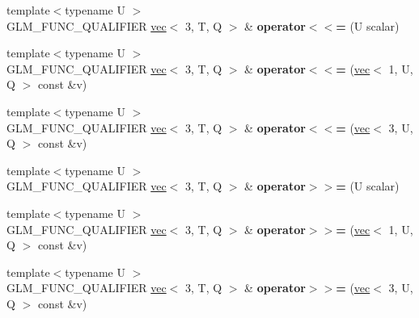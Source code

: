 \begin{DoxyCompactItemize}
{\footnotesize template$<$typename U $>$ }\\G\+L\+M\+\_\+\+F\+U\+N\+C\+\_\+\+Q\+U\+A\+L\+I\+F\+I\+ER \hyperlink{structglm_1_1vec}{vec}$<$ 3, T, Q $>$ \& {\bfseries operator$<$$<$=} (U scalar)
\item 
\mbox{\label{structglm_1_1vec_3_013_00_01T_00_01Q_01_4_a4db1d87628b5f4ee744873e4affc61e5}} 
{\footnotesize template$<$typename U $>$ }\\G\+L\+M\+\_\+\+F\+U\+N\+C\+\_\+\+Q\+U\+A\+L\+I\+F\+I\+ER \hyperlink{structglm_1_1vec}{vec}$<$ 3, T, Q $>$ \& {\bfseries operator$<$$<$=} (\hyperlink{structglm_1_1vec}{vec}$<$ 1, U, Q $>$ const \&v)
\item 
\mbox{\label{structglm_1_1vec_3_013_00_01T_00_01Q_01_4_a0e01e643e55134493df457aa0b17308e}} 
{\footnotesize template$<$typename U $>$ }\\G\+L\+M\+\_\+\+F\+U\+N\+C\+\_\+\+Q\+U\+A\+L\+I\+F\+I\+ER \hyperlink{structglm_1_1vec}{vec}$<$ 3, T, Q $>$ \& {\bfseries operator$<$$<$=} (\hyperlink{structglm_1_1vec}{vec}$<$ 3, U, Q $>$ const \&v)
\item 
\mbox{\label{structglm_1_1vec_3_013_00_01T_00_01Q_01_4_a63341fff7a58c15da93cf79016cdeefa}} 
{\footnotesize template$<$typename U $>$ }\\G\+L\+M\+\_\+\+F\+U\+N\+C\+\_\+\+Q\+U\+A\+L\+I\+F\+I\+ER \hyperlink{structglm_1_1vec}{vec}$<$ 3, T, Q $>$ \& {\bfseries operator$>$$>$=} (U scalar)
\item 
\mbox{\label{structglm_1_1vec_3_013_00_01T_00_01Q_01_4_afa71288540c821e11e3f316c16ed1274}} 
{\footnotesize template$<$typename U $>$ }\\G\+L\+M\+\_\+\+F\+U\+N\+C\+\_\+\+Q\+U\+A\+L\+I\+F\+I\+ER \hyperlink{structglm_1_1vec}{vec}$<$ 3, T, Q $>$ \& {\bfseries operator$>$$>$=} (\hyperlink{structglm_1_1vec}{vec}$<$ 1, U, Q $>$ const \&v)
\item 
\mbox{\label{structglm_1_1vec_3_013_00_01T_00_01Q_01_4_a62459f7f3447a3022b4079f62a719824}} 
{\footnotesize template$<$typename U $>$ }\\G\+L\+M\+\_\+\+F\+U\+N\+C\+\_\+\+Q\+U\+A\+L\+I\+F\+I\+ER \hyperlink{structglm_1_1vec}{vec}$<$ 3, T, Q $>$ \& {\bfseries operator$>$$>$=} (\hyperlink{structglm_1_1vec}{vec}$<$ 3, U, Q $>$ const \&v)
\end{DoxyCompactItemize}
